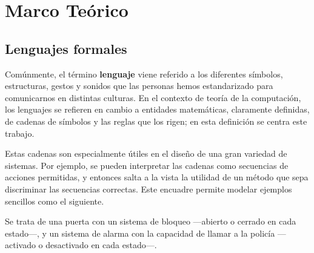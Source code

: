 
\chapter{Marco Teórico}
\label{marcoteorico}

\section{Lenguajes formales}



Comúnmente, el término \textbf{lenguaje} viene referido a los diferentes símbolos, estructuras, gestos y sonidos que las personas hemos estandarizado para comunicarnos en distintas culturas. En el contexto de teoría de la computación, los lenguajes se refieren en cambio a entidades matemáticas, claramente definidas, de cadenas de símbolos y las reglas que los rigen; en esta definición se centra este trabajo.

Estas cadenas son especialmente útiles en el diseño de una gran variedad de sistemas. Por ejemplo, se pueden interpretar las cadenas como secuencias de acciones permitidas, y entonces salta a la vista la utilidad de un método que sepa discriminar las secuencias correctas. Este encuadre permite modelar ejemplos sencillos como el siguiente.

Se trata de una puerta con un sistema de bloqueo —abierto o cerrado en cada estado—, y un sistema de alarma con la capacidad de llamar a la policía —activado o desactivado en cada estado—. 

